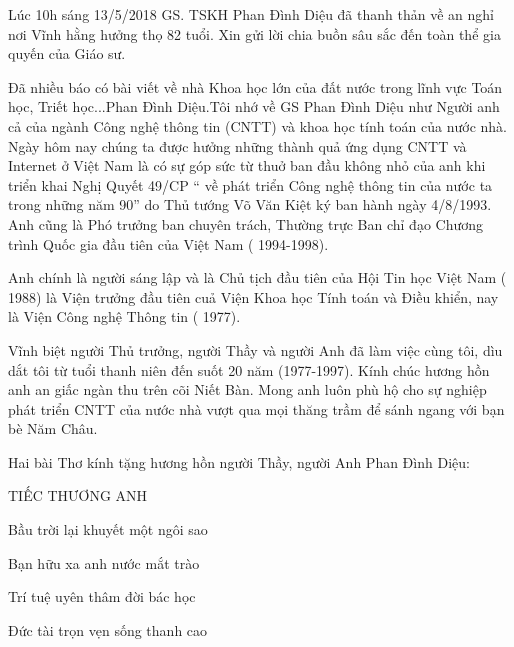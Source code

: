 
Lúc 10h sáng 13/5/2018 GS. TSKH Phan Đình Diệu đã thanh thản về an nghỉ nơi Vĩnh hằng hưởng thọ 82 tuổi. Xin gửi lời chia buồn sâu sắc  đến toàn thể gia quyến của Giáo sư.

Đã nhiều báo có bài viết về nhà Khoa học lớn của đất nước trong lĩnh vực Toán học, Triết học...Phan Đình Diệu.Tôi nhớ về GS Phan Đình Diệu như Người anh cả của ngành Công nghệ thông tin (CNTT) và khoa học tính toán của nước nhà. Ngày hôm nay chúng ta được hưởng những thành quả ứng dụng CNTT và Internet ở Việt Nam là có sự góp sức từ thuở ban đầu không nhỏ của anh khi triển khai Nghị Quyết 49/CP “ về phát triển Công nghệ thông tin của nước ta trong những năm 90” do Thủ tướng Võ Văn Kiệt ký ban hành ngày 4/8/1993. Anh cũng là Phó trưởng ban chuyên trách, Thường trực Ban chỉ đạo Chương trình Quốc gia đầu tiên của Việt Nam ( 1994-1998). 

Anh chính là người sáng lập và là Chủ tịch đầu tiên của Hội Tin học Việt Nam ( 1988) là Viện trưởng đầu tiên cuả Viện Khoa học Tính toán và Điều khiển, nay là Viện Công nghệ Thông tin ( 1977).

Vĩnh biệt người Thủ trưởng, người Thầy và  người Anh đã  làm việc cùng tôi, dìu dắt tôi từ tuổi thanh niên đến suốt 20 năm (1977-1997). Kính chúc hương hồn anh an giấc ngàn thu trên cõi Niết Bàn. Mong anh luôn phù hộ cho sự nghiệp phát triển CNTT của nước nhà vượt qua mọi thăng trầm để sánh ngang với bạn bè Năm Châu. 








Hai bài Thơ kính tặng hương hồn  người Thầy, người Anh Phan Đình Diệu:

TIẾC THƯƠNG ANH

Bầu trời lại khuyết một ngôi sao

Bạn hữu xa anh nước mắt trào

Trí tuệ uyên thâm đời bác học

Đức tài trọn vẹn sống thanh cao

